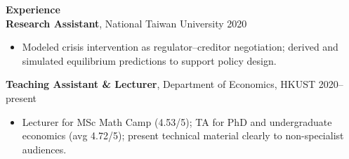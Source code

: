 \documentclass[11pt,letterpaper]{article}
\begin{document}
{\large \textbf{Experience}}\\[-0.5pt]
\textbf{Research Assistant}, National Taiwan University \hfill 2020\\
\vspace{-6pt}
\begin{itemize}
  \item Modeled crisis intervention as regulator--creditor negotiation; derived and simulated equilibrium predictions to support policy design.
\end{itemize}
\textbf{Teaching Assistant \& Lecturer}, Department of Economics, HKUST \hfill 2020--present\\
\vspace{-6pt}
\begin{itemize}
  \item Lecturer for MSc Math Camp (4.53/5); TA for PhD and undergraduate economics (avg 4.72/5); present technical material clearly to non-specialist audiences.
\end{itemize}

\vspace{0.15pt}
\end{document}
